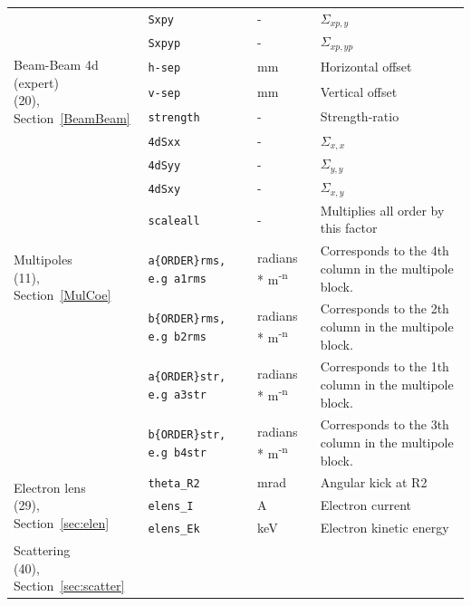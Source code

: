\begin{table}[ht]
\begin{center}
\begin{tabular}{|l | l | l | p{6cm}|}
    & \texttt{Sxpy}      & -       & $\Sigma_{xp,y}$ \\
    & \texttt{Sxpyp}     & -       & $\Sigma_{xp,yp}$ \\
   \hline
      \multirow{3}{*}{\parbox{4cm}{Beam-Beam 4d (expert) \\ (20),\\ Section~\ref{BeamBeam}}}
    & \texttt{h-sep}     & mm      & Horizontal offset \\
    & \texttt{v-sep}     & mm      & Vertical offset \\
    & \texttt{strength}  & -       & Strength-ratio \\
    & \texttt{4dSxx}     & -       & $\Sigma_{x,x}$  \\
    & \texttt{4dSyy}     & -       & $\Sigma_{y,y}$ \\
    & \texttt{4dSxy}     & -       & $\Sigma_{x,y}$ \\
  \hline
    \multirow{3}{*}{\parbox{4cm}{Multipoles \\ (11),\\ Section~\ref{MulCoe}}}
    & \texttt{scaleall}  & -       & Multiplies all order by this factor \\
    & \texttt{a\{ORDER\}rms, e.g a1rms}& radians * m\textsuperscript{-n}  & Corresponds to the 4th column in the multipole block. \\
    & \texttt{b\{ORDER\}rms, e.g b2rms}& radians * m\textsuperscript{-n}  & Corresponds to the 2th column in the multipole block. \\
    & \texttt{a\{ORDER\}str, e.g a3str}& radians * m\textsuperscript{-n}  & Corresponds to the 1th column in the multipole block. \\
    & \texttt{b\{ORDER\}str, e.g b4str}& radians * m\textsuperscript{-n}  & Corresponds to the 3th column in the multipole block. \\
  \hline
    \multirow{3}{*}{\parbox{4cm}{Electron lens \\ (29),\\ Section~\ref{sec:elen}}}
    & \texttt{theta\_R2}     & mrad      & Angular kick at R2 \\
    & \texttt{elens\_I}      & A         & Electron current   \\
    & \texttt{elens\_Ek}     & keV       & Electron kinetic energy \\
  \hline
    \multirow{3}{*}{\parbox{4cm}{Scattering \\ (40),\\ Section~\ref{sec:scatter}} }

\end{tabular}
\end{center}
\end{table}
